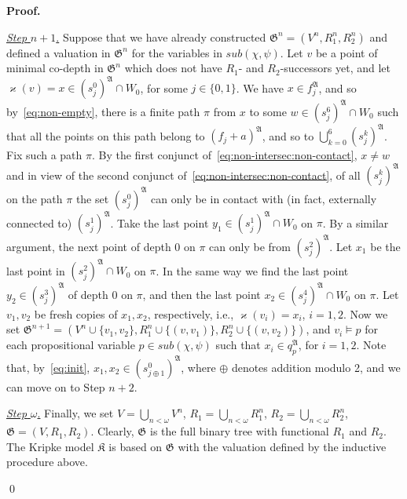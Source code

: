 \documentclass{LMCS}
\renewenvironment{proof}{\par\noindent\textbf{Proof.}}{\mbox{}\qed\par\medskip}
\theoremstyle{plain}
\begin{document}
\begin{proof}
\smallskip

\underline{\emph{Step} $n+1$.} Suppose that we have already
constructed $\mathfrak G^n =(V^n,R_1^n,R_2^n)$ and defined a
valuation in $\mathfrak G^n$ for the variables in
$\mathit{sub}(\chi,\psi)$. Let $v$ be a point of minimal co-depth
in $\mathfrak G^n$ which does not have $R_1$- and $R_2$-successors
yet, and let $\varkappa(v)=x \in (s_j^0)^{\mathfrak A}\cap W_0$, for some
$j\in \{0,1\}$.
We have $x \in f_j^{\mathfrak A}$, and so
by~\eqref{eq:non-empty}, there is a finite
path $\pi$ from $x$ to some $w \in (s_j^6)^{\mathfrak A}\cap W_0$
such that all the points on this path belong to $(f_j+a)^{\mathfrak A}$, and so to $\bigcup_{k =
0}^6 (s_j^k)^{\mathfrak A}$. Fix such a path
$\pi$. By the first conjunct
of~\eqref{eq:non-intersec:non-contact}, $x \ne w$ and in view of the second conjunct
of~\eqref{eq:non-intersec:non-contact}, of all
$(s_j^k)^{\mathfrak A}$ on the path $\pi$ the
set $(s_j^0)^{\mathfrak A}$ can only be in contact with (in fact,
externally connected to) $(s_j^1)^{\mathfrak A}$. Take the last
point $y_1 \in (s_j^1)^{\mathfrak A}\cap W_0$
on $\pi$. By a
similar argument, the next point of depth $0$ on $\pi$ can only be
from $(s_j^2)^{\mathfrak A}$. Let $x_1$ be the last point
in $(s_j^2)^{\mathfrak A}\cap W_0$ on $\pi$. In the same way we find the
last point $y_2 \in (s_j^3)^{\mathfrak A}$ of depth $0$ on $\pi$,
and then the last point $x_2 \in (s_j^4)^{\mathfrak A}\cap W_0$
on $\pi$. Let $v_1,v_2$ be fresh copies of $x_1,x_2$,
respectively, i.e., $\varkappa(v_i) = x_i$, $i = 1,2$. Now we set
$\mathfrak G^{n+1} =(V^n \cup \{v_1, v_2 \},R_1^n \cup \{ (v,
v_1) \},R_2^n \cup \{ (v,
v_2) \})$, and
$v_i\models p$ for each propositional variable $p \in
\mathit{sub}(\chi,\psi)$ such that $x_i \in q_p^{\mathfrak A}$, for
$i=1,2$. Note that, by~\eqref{eq:init}, $x_1,x_2\in (s^0_{j\oplus
1})^{\mathfrak A}$, where $\oplus$ denotes addition modulo 2, and we can move on to Step $n+2$.

\smallskip

\underline{\emph{Step} $\omega$.} Finally, we set $V=
\bigcup_{n<\omega} V^n$, $R_1= \bigcup_{n<\omega} R_1^n$,  $R_2=
\bigcup_{n<\omega} R_2^n$, $\mathfrak G =(V,R_1,R_2)$. Clearly,
$\mathfrak G$ is the full binary tree with functional $R_1$ and $R_2$.
The Kripke model $\mathfrak K$ is based on $\mathfrak G$ with the
valuation defined by the inductive procedure above.


\end{proof}
\end{document}
